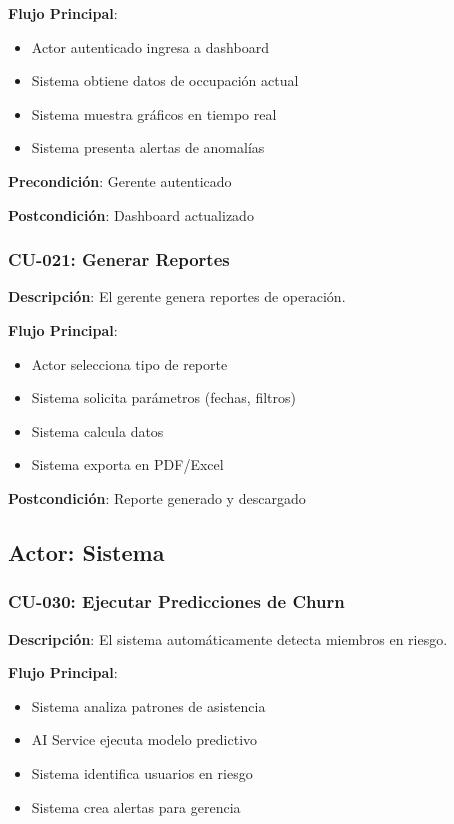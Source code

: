 \documentclass[11pt,a4paper]{article}
\begin{document}
\begin{itemize}
\begin{definicion}
\textbf{Flujo Principal}:
\begin{itemize}
    \item Actor autenticado ingresa a dashboard
    \item Sistema obtiene datos de occupación actual
    \item Sistema muestra gráficos en tiempo real
    \item Sistema presenta alertas de anomalías
\end{itemize}

\textbf{Precondición}: Gerente autenticado

\textbf{Postcondición}: Dashboard actualizado
\end{definicion}

\subsubsection{CU-021: Generar Reportes}

\begin{definicion}
\textbf{Descripción}: El gerente genera reportes de operación.

\textbf{Flujo Principal}:
\begin{itemize}
    \item Actor selecciona tipo de reporte
    \item Sistema solicita parámetros (fechas, filtros)
    \item Sistema calcula datos
    \item Sistema exporta en PDF/Excel
\end{itemize}

\textbf{Postcondición}: Reporte generado y descargado
\end{definicion}

\subsection{Actor: Sistema}

\subsubsection{CU-030: Ejecutar Predicciones de Churn}

\begin{definicion}
\textbf{Descripción}: El sistema automáticamente detecta miembros en riesgo.

\textbf{Flujo Principal}:
\begin{itemize}
    \item Sistema analiza patrones de asistencia
    \item AI Service ejecuta modelo predictivo
    \item Sistema identifica usuarios en riesgo
    \item Sistema crea alertas para gerencia
\end{itemize}


\end{definicion}
\end{itemize}
\end{document}
